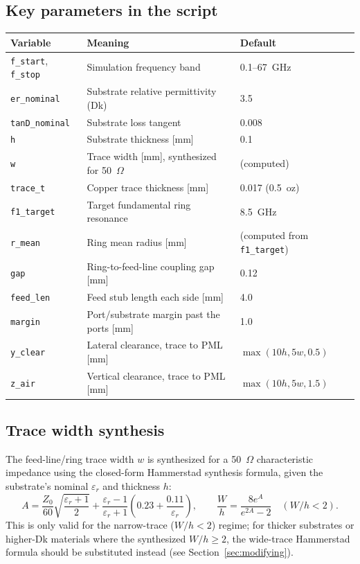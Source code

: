 \documentclass[11pt]{article}
\begin{document}
\subsection{Key parameters in the script}

\begin{center}
\begin{tabular}{@{}lll@{}}
\toprule
\textbf{Variable} & \textbf{Meaning} & \textbf{Default} \\
\midrule
\texttt{f\_start}, \texttt{f\_stop} & Simulation frequency band & 0.1--67~GHz \\
\texttt{er\_nominal} & Substrate relative permittivity (Dk) & 3.5 \\
\texttt{tanD\_nominal} & Substrate loss tangent & 0.008 \\
\texttt{h} & Substrate thickness [mm] & 0.1 \\
\texttt{w} & Trace width [mm], synthesized for 50~$\Omega$ & (computed) \\
\texttt{trace\_t} & Copper trace thickness [mm] & 0.017 (0.5~oz) \\
\texttt{f1\_target} & Target fundamental ring resonance & 8.5~GHz \\
\texttt{r\_mean} & Ring mean radius [mm] & (computed from \texttt{f1\_target}) \\
\texttt{gap} & Ring-to-feed-line coupling gap [mm] & 0.12 \\
\texttt{feed\_len} & Feed stub length each side [mm] & 4.0 \\
\texttt{margin} & Port/substrate margin past the ports [mm] & 1.0 \\
\texttt{y\_clear} & Lateral clearance, trace to PML [mm] & $\max(10h, 5w, 0.5)$ \\
\texttt{z\_air} & Vertical clearance, trace to PML [mm] & $\max(10h, 5w, 1.5)$ \\
\bottomrule
\end{tabular}
\end{center}

\subsection{Trace width synthesis}

The feed-line/ring trace width $w$ is synthesized for a 50~$\Omega$
characteristic impedance using the closed-form Hammerstad synthesis formula,
given the substrate's nominal $\varepsilon_r$ and thickness $h$:
\[
A = \frac{Z_0}{60}\sqrt{\frac{\varepsilon_r+1}{2}}
   + \frac{\varepsilon_r - 1}{\varepsilon_r + 1}
     \left(0.23 + \frac{0.11}{\varepsilon_r}\right), \qquad
\frac{W}{h} = \frac{8 e^{A}}{e^{2A} - 2} \quad (W/h < 2).
\]
This is only valid for the narrow-trace ($W/h < 2$) regime; for thicker
substrates or higher-Dk materials where the synthesized $W/h \geq 2$, the
wide-trace Hammerstad formula should be substituted instead (see
Section~\ref{sec:modifying}).
\end{document}
